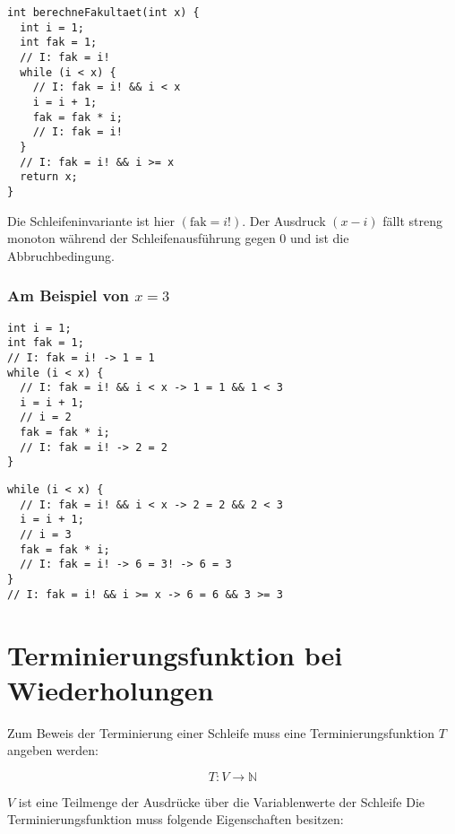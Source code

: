 \documentclass{lehramt-informatik-haupt}
\begin{document}
\begin{verbatim}
int berechneFakultaet(int x) {
  int i = 1;
  int fak = 1;
  // I: fak = i!
  while (i < x) {
    // I: fak = i! && i < x
    i = i + 1;
    fak = fak * i;
    // I: fak = i!
  }
  // I: fak = i! && i >= x
  return x;
}
\end{verbatim}

\noindent
Die Schleifeninvariante ist hier $(\text{fak} = i!)$. Der Ausdruck $(x -
i)$ fällt streng monoton während der Schleifenausführung gegen $0$ und
ist die Abbruchbedingung.

\subsubsection{Am Beispiel von $x = 3$}

\begin{multicols}{2}

\begin{verbatim}
int i = 1;
int fak = 1;
// I: fak = i! -> 1 = 1
while (i < x) {
  // I: fak = i! && i < x -> 1 = 1 && 1 < 3
  i = i + 1;
  // i = 2
  fak = fak * i;
  // I: fak = i! -> 2 = 2
}
\end{verbatim}


\begin{verbatim}
while (i < x) {
  // I: fak = i! && i < x -> 2 = 2 && 2 < 3
  i = i + 1;
  // i = 3
  fak = fak * i;
  // I: fak = i! -> 6 = 3! -> 6 = 3
}
// I: fak = i! && i >= x -> 6 = 6 && 3 >= 3
\end{verbatim}

\end{multicols}

%

\section{Terminierungsfunktion bei Wiederholungen}

Zum Beweis der Terminierung einer Schleife muss eine
Terminierungsfunktion $T$ angeben werden:

\begin{displaymath}
T \colon V \rightarrow \mathbb{N}
\end{displaymath}

$V$ ist eine Teilmenge der Ausdrücke über die Variablenwerte der Schleife
Die Terminierungsfunktion muss folgende Eigenschaften besitzen:
\end{document}
